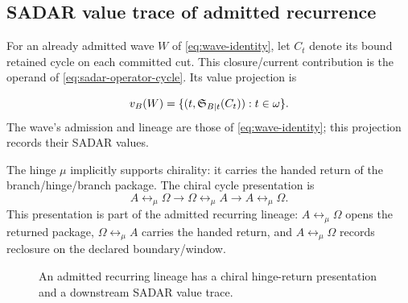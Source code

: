 \subsection{SADAR value trace of admitted recurrence}
\label{subsec:cycle-wave-identity}
For an already admitted wave \(W\) of \eqref{eq:wave-identity}, let \(C_t\)
denote its bound retained cycle on each committed cut. This closure/current
contribution is the operand of \eqref{eq:sadar-operator-cycle}. Its value
projection is

\begin{equation}
v_B(W)=\{(t,\mathfrak S_{B|t}(C_t)):t\in\omega\}.
\label{eq:wave-sadar-presentation}
\end{equation}
The wave's admission and lineage are those of \eqref{eq:wave-identity}; this
projection records their SADAR values.

The hinge \(\mu\) implicitly supports chirality: it carries the handed return of the branch/hinge/branch package. The chiral cycle presentation is
\begin{equation}
A\leftrightarrow_{\mu}\Omega\rightarrow\Omega\leftrightarrow_{\mu}A\rightarrow A\leftrightarrow_{\mu}\Omega.
\label{eq:ao-chiral-cycle-presentation}
\end{equation}
This presentation is part of the admitted recurring lineage: \(A\leftrightarrow_{\mu}\Omega\) opens the returned package, \(\Omega\leftrightarrow_{\mu}A\) carries the handed return, and \(A\leftrightarrow_{\mu}\Omega\) records reclosure on the declared boundary/window.

\begin{figure}[H]
\centering
{}
\caption{An admitted recurring lineage has a chiral hinge-return presentation and a downstream SADAR value trace.}
\label{fig:cycle-wave-identity}
\end{figure}

